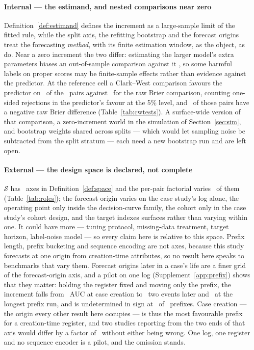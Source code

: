 \paragraph{Internal --- the estimand, and nested comparisons near zero}
Definition~\ref{def:estimand} defines the increment as a large-sample limit
of the fitted rule, while the split axis, the refitting bootstrap and the
forecast origins treat the forecasting \emph{method}, with its finite
estimation window, as the object, as \citet{giacomini2006conditional} do.
Near a zero increment the two differ: estimating the larger model's extra
parameters biases an out-of-sample comparison against it
\citep{clark2007approximately}, so some harmful labels on proper scores may
be finite-sample effects rather than evidence against the predictor. At the
reference cell a Clark--West comparison favours the predictor on
\nRejectCw\ of the \nPairs\ pairs against \nRejectDmBrier\ for the raw
Brier comparison, counting one-sided rejections in the predictor's favour at
the 5\% level, and \nCwReverses\ of those pairs have a negative raw Brier
difference (Table~\ref{tab:cwtests}). A surface-wide version of that comparison, a
zero-increment world in the simulation of Section~\ref{sec:sim}, and
bootstrap weights shared across splits --- which would let sampling noise be
subtracted from the split stratum --- each need a new bootstrap run and are
left open.

\paragraph{External --- the design space is declared, not complete}
$\mathcal{S}$ has \nAxes\ axes in Definition~\ref{def:space} and the per-pair
factorial varies \nPerPairAxes\ of them (Table~\ref{tab:roles}); the forecast
origin varies on the case study's log alone, the operating point only inside
the decision-curve family, the cohort only in the case study's cohort design,
and the target indexes surfaces rather than varying within one. It could have
more --- tuning protocol, missing-data treatment, target horizon, label-noise
model --- so every claim here is relative to this space. Prefix length,
prefix bucketing and sequence encoding are not axes, because this study
forecasts at one origin from creation-time attributes, so no result here
speaks to benchmarks that vary them. Forecast origins later in a case's life
are a finer grid of the forecast-origin axis, and a pilot on one log
(Supplement~\ref{app:prefix}) shows that they matter: holding the register
fixed and moving only the prefix, the increment falls from \VPrefixZero\ AUC
at case creation to \VPrefixTwo\ two events later and \VPrefixEight\ at the
longest prefix run, and is undetermined in sign at \nPrefixUnresolved\ of
\nPrefixLevels\ prefixes. Case creation --- the origin every other result here
occupies --- is thus the most favourable prefix for a creation-time register,
and two studies reporting from the two ends of that axis would differ by a
factor of \prefixDropFactor\ without either being wrong. One log, one register
and no sequence encoder is a pilot, and the omission stands.

